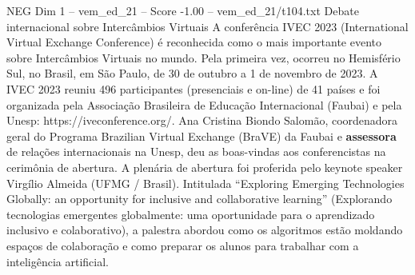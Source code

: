 \begin{textsample}{NEG Dim 1 – vem\_ed\_21 – Score -1.00 – vem\_ed\_21/t104.txt}  \label{ex:f1_neg_051}
Debate internacional sobre Intercâmbios Virtuais A conferência IVEC 2023 (International Virtual Exchange Conference) é reconhecida como o mais importante evento sobre Intercâmbios Virtuais no mundo.
Pela primeira vez, ocorreu no Hemisfério Sul, no Brasil, em São Paulo, de 30 de outubro a 1 de novembro de 2023.
A IVEC 2023 reuniu 496 participantes (presenciais e on-line) de 41 países e foi organizada pela Associação Brasileira de Educação Internacional (Faubai) e pela Unesp: https://iveconference.org/.
Ana Cristina Biondo Salomão, coordenadora geral do Programa Brazilian Virtual Exchange (BraVE) da Faubai e \textbf{assessora} de relações internacionais na Unesp, deu as boas-vindas aos conferencistas na cerimônia de abertura.
A plenária de abertura foi proferida pelo keynote speaker Virgílio Almeida (UFMG / Brasil).
Intitulada “Exploring Emerging Technologies Globally: an opportunity for inclusive and collaborative learning” (Explorando tecnologias emergentes globalmente: uma oportunidade para o aprendizado inclusivo e colaborativo), a palestra abordou como os algoritmos estão moldando espaços de colaboração e como preparar os alunos para trabalhar com a inteligência artificial.

\end{textsample}
